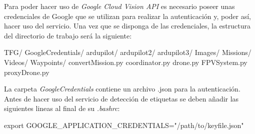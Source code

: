 
Para poder hacer uso de \textit{Google Cloud Vision \acs{API}} es necesario poseer unas credenciales de Google que se utilizan para realizar la autenticación y, poder así, hacer uso del servicio. Una vez que se disponga de las credenciales, la estructura del directorio de trabajo será la siguiente:

\begin{listing}[
 float=h!,
 language = bash,
 caption = {Estructura del directorio de trabajo tras descargar las credenciales de Google},
 label  = code:estructura2]
TFG/
   GoogleCredentials/
   ardupilot/
   ardupilot2/
   ardupilot3/
   Images/
   Missions/
   Videos/
   Waypoints/
   convertMission.py
   coordinator.py
   drone.py
   FPVSystem.py
   proxyDrone.py
\end{listing}

La carpeta \textit{GoogleCredentials} contiene un archivo .json para la autenticación. Antes de hacer uso del servicio de detección de etiquetas se deben añadir las siguientes lineas al final de su \textit{.bashrc}:
\begin{listing}[
 float=h!,
 language = bash,
 caption = {Líneas a incorporar en \textit{.bashrc} para hacer uso de Google Cloud Vision \acs{API}},
 label  = code:export2]
export GOOGLE_APPLICATION_CREDENTIALS="/path/to/keyfile.json"
\end{listing}  


